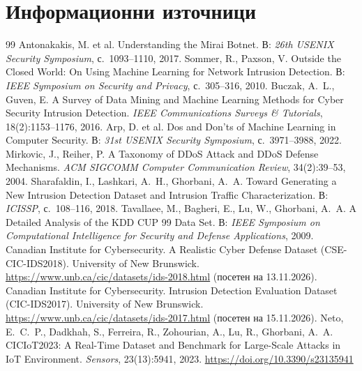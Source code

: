 \chapter{Информационни източници}\label{ch:refs}
\begingroup
\makeatletter
\renewcommand{\chapter}{\@ifstar\@gobble\@gobble}
\makeatother
\small
\begin{thebibliography}{99}\setlength{\itemsep}{3pt}
 Antonakakis, M. et al. Understanding the Mirai Botnet. В: \emph{26th USENIX Security Symposium}, с.~1093--1110, 2017.
 Sommer, R., Paxson, V. Outside the Closed World: On Using Machine Learning for Network Intrusion Detection. В: \emph{IEEE Symposium on Security and Privacy}, с.~305--316, 2010.
 Buczak, A.~L., Guven, E. A Survey of Data Mining and Machine Learning Methods for Cyber Security Intrusion Detection. \emph{IEEE Communications Surveys \& Tutorials}, 18(2):1153--1176, 2016.
 Arp, D. et al. Dos and Don'ts of Machine Learning in Computer Security. В: \emph{31st USENIX Security Symposium}, с.~3971--3988, 2022.
 Mirkovic, J., Reiher, P. A Taxonomy of DDoS Attack and DDoS Defense Mechanisms. \emph{ACM SIGCOMM Computer Communication Review}, 34(2):39--53, 2004.
 Sharafaldin, I., Lashkari, A.~H., Ghorbani, A.~A. Toward Generating a New Intrusion Detection Dataset and Intrusion Traffic Characterization. В: \emph{ICISSP}, с.~108--116, 2018.
 Tavallaee, M., Bagheri, E., Lu, W., Ghorbani, A.~A. A Detailed Analysis of the KDD CUP 99 Data Set. В: \emph{IEEE Symposium on Computational Intelligence for Security and Defense Applications}, 2009.
 Canadian Institute for Cybersecurity. A Realistic Cyber Defense Dataset (CSE-CIC-IDS2018). University of New Brunswick. \url{https://www.unb.ca/cic/datasets/ids-2018.html} (посетен на 13.11.2026).
 Canadian Institute for Cybersecurity. Intrusion Detection Evaluation Dataset (CIC-IDS2017). University of New Brunswick. \url{https://www.unb.ca/cic/datasets/ids-2017.html} (посетен на 15.11.2026).
 Neto, E.~C.~P., Dadkhah, S., Ferreira, R., Zohourian, A., Lu, R., Ghorbani, A.~A. CICIoT2023: A Real-Time Dataset and Benchmark for Large-Scale Attacks in IoT Environment. \emph{Sensors}, 23(13):5941, 2023. \url{https://doi.org/10.3390/s23135941}

\end{thebibliography}
